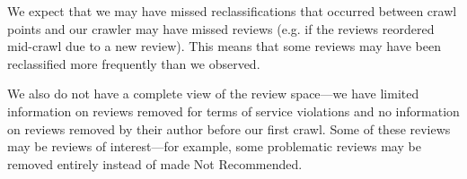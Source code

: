 
We expect that we may have missed reclassifications that occurred between crawl points and our crawler may have missed reviews (e.g. if the reviews reordered mid-crawl due to a new review). This means that some reviews may have been reclassified more frequently than we observed.

We also do not have a complete view of the review space---we have limited information on reviews removed for terms of service violations and no information on reviews removed by their author before our first crawl. Some of these reviews may be reviews of interest---for example, some problematic reviews may be removed entirely instead of made Not Recommended. %

